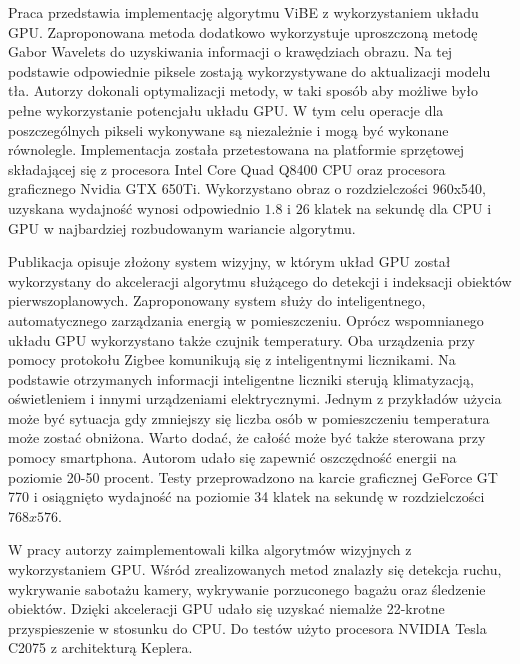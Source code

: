 \documentclass[b5paper,10pt,twoside]{article}
\begin{document}
{ 
Praca \cite{Qin_2015} przedstawia implementację algorytmu ViBE z wykorzystaniem układu GPU.
Zaproponowana metoda dodatkowo wykorzystuje uproszczoną metodę Gabor Wavelets do uzyskiwania informacji o krawędziach obrazu. 
Na tej podstawie odpowiednie piksele zostają wykorzystywane do aktualizacji modelu tła. 
Autorzy dokonali optymalizacji metody, w taki sposób aby możliwe było pełne wykorzystanie potencjału układu GPU. 
W tym celu operacje dla poszczególnych pikseli wykonywane są niezależnie i mogą być wykonane równolegle. 
Implementacja została przetestowana na platformie sprzętowej składającej się z procesora Intel Core Quad Q8400 CPU oraz procesora graficznego Nvidia GTX 650Ti. 
Wykorzystano obraz o rozdzielczości 960x540, uzyskana wydajność wynosi odpowiednio $1.8$ i $26$ klatek na sekundę dla CPU i GPU w najbardziej rozbudowanym wariancie algorytmu.


Publikacja \cite{Song_2016} opisuje złożony system wizyjny, w którym układ GPU został wykorzystany do akceleracji algorytmu służącego do detekcji i indeksacji obiektów pierwszoplanowych. 
Zaproponowany system służy do inteligentnego, automatycznego zarządzania energią w pomieszczeniu. 
Oprócz wspomnianego układu GPU wykorzystano także czujnik temperatury. 
Oba urządzenia przy pomocy protokołu Zigbee komunikują się z inteligentnymi licznikami. 
Na podstawie otrzymanych informacji inteligentne liczniki sterują klimatyzacją, oświetleniem i innymi urządzeniami elektrycznymi. 
Jednym z przykładów użycia może być sytuacja gdy zmniejszy się liczba osób w pomieszczeniu temperatura może zostać obniżona. 
Warto dodać, że całość może być także sterowana przy pomocy smartphona. 
Autorom udało się zapewnić oszczędność energii na poziomie 20-50 procent. 
Testy przeprowadzono na karcie graficznej GeForce GT 770 i osiągnięto wydajność na poziomie 34 klatek na sekundę w rozdzielczości $768x576$.


W pracy \cite{Guler_2016} autorzy zaimplementowali kilka algorytmów wizyjnych z wykorzystaniem GPU. 
Wśród zrealizowanych metod znalazły się detekcja ruchu, wykrywanie sabotażu kamery, wykrywanie porzuconego bagażu oraz śledzenie obiektów. Dzięki akceleracji GPU udało się uzyskać niemalże 22-krotne przyspieszenie w stosunku do CPU. Do testów użyto procesora NVIDIA Tesla C2075 z architekturą Keplera. 

}
\end{document}
